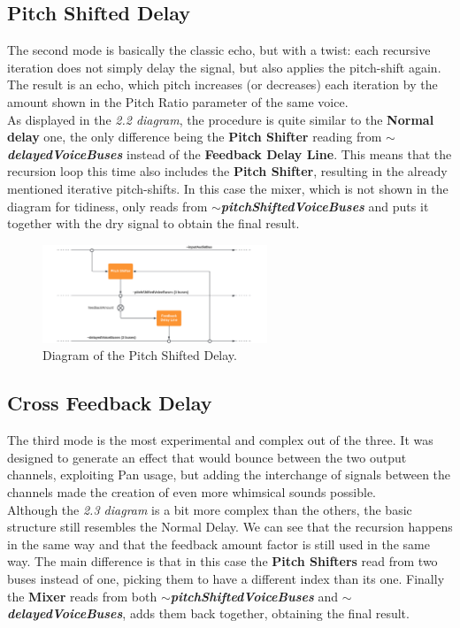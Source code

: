 \documentclass{article}
\begin{document}
\subsection{Pitch Shifted Delay}
The second mode is basically the classic echo, but with a twist: each recursive iteration does not simply delay the signal, but also applies the pitch-shift again. The result is an echo, which pitch increases (or decreases) each iteration by the amount shown in the Pitch Ratio parameter of the same voice.
\\As displayed in the \textit{2.2 diagram}, the procedure is quite similar to the \textbf{Normal delay} one, the only difference being the \textbf{Pitch Shifter} reading from \textbf{\textit{$\sim$delayedVoiceBuses}} instead of the \textbf{Feedback Delay Line}. This means that the recursion loop this time also includes the \textbf{Pitch Shifter}, resulting in the already mentioned iterative pitch-shifts. In this case the mixer, which is not shown in the diagram for tidiness, only reads from \textbf{\textit{$\sim$pitchShiftedVoiceBuses}} and puts it together with the dry signal to obtain the final result.

\begin{figure}[H]
\centering
  \includegraphics[width=0.6\textwidth]{Pitch_Feedback.png}
    \caption{Diagram of the Pitch Shifted Delay.}
\end{figure}

\subsection{Cross Feedback Delay}
The third mode is the most experimental and complex out of the three. It was designed to generate an effect that would bounce between the two output channels, exploiting Pan usage, but adding the interchange of signals between the channels made the creation of even more whimsical sounds possible.
\\Although the \textit{2.3 diagram} is a bit more complex than the others, the basic structure still resembles the Normal Delay. We can see that the recursion happens in the same way and that the feedback amount factor is still used in the same way. The main difference is that in this case the \textbf{Pitch Shifters} read from two buses instead of one, picking them to have a different index than its one. Finally the \textbf{Mixer} reads from both \textbf{\textit{$\sim$pitchShiftedVoiceBuses}} and \textbf{\textit{$\sim$delayedVoiceBuses}}, adds them back together, obtaining the final result.
\end{document}
